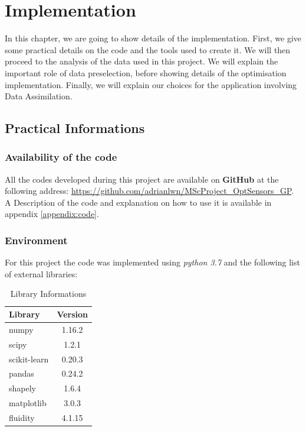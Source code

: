 \chapter{Implementation}


In this chapter, we are going to show details of the implementation. First, we give some practical details on the code and the tools used to create it.  We will then proceed to the analysis of the data used in this project. We will explain the important role of data preselection, before showing details of the optimisation implementation. Finally, we will explain our choices for the application involving Data Assimilation. 

\section{Practical Informations}


\subsection{Availability of the code}

All the codes developed during this project are available on \textbf{GitHub} at the following address: \url{https://github.com/adrianlwn/MScProject\_OptSensors\_GP}. A Description of the code and explanation on how to use it is available in appendix \ref{appendix:code}. 


\subsection{Environment}

For this project the code was implemented using \textit{python 3.7} and the following list of external libraries: 

\begin{table}[h!]
\centering
\begin{tabular}{l|c}
\toprule
Library & Version \\ \midrule
numpy & 1.16.2 \\
scipy & 1.2.1\\
scikit-learn & 0.20.3 \\
pandas & 0.24.2 \\
shapely & 1.6.4 \\
matplotlib & 3.0.3\\ 
fluidity & 4.1.15 \\
\bottomrule

\end{tabular}
\caption{Library Informations}
\end{table}

